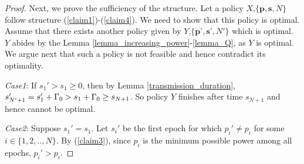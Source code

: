 \begin{proof}

Next, we prove the sufficiency of the structure. Let a policy $X$,$\{\textbf{p},\textbf{s},N\}$ follow  structure (\ref{claim1})-(\ref{claim4}). We need to show that this policy is optimal. Assume that there exists another policy given by $Y$,$\{\textbf{p'},\textbf{s'},N'\}$ which is optimal. $Y$ abides by the Lemma \ref{lemma_increasing_power}-\ref{lemma_Q}, as $Y$ is optimal. We argue next that such a policy is not feasible and hence contradict its optimality. 

\textit{Case1}: If $s_1'>s_1\ge 0$, then by Lemma \ref{transmission_duration}, $s_{N'+1}'=s_1'+\Gamma_0>s_1+\Gamma_0\ge s_{N+1}$. So policy $Y$ finishes after time $s_{N+1}$ and hence cannot be optimal. 

\textit{Case2}: Suppose $s_1'=s_1$. Let $s_i'$ be the first epoch for which $p_i'\ne p_i$ for some $i \in \{1,2,..,N\}$. By (\ref{claim3}), since $p_i$ is the minimum possible power among all epochs, $p_i'>p_i$. 



\end{proof}
